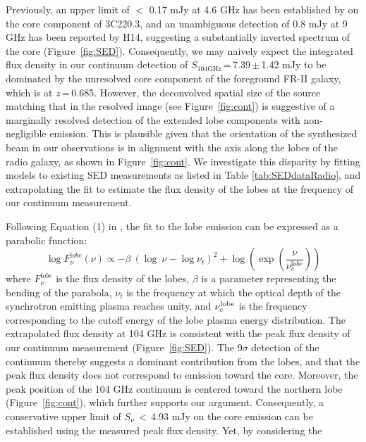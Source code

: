\documentclass[twocolumn,apj,numberedappendix]{emulateapj}
\begin{document}
Previously,  an upper
limit of $<$ 0.17 mJy at 4.6 GHz has been established by \citet{Mullin06a} on the core component of 3C220.3, and an unambiguous detection of 0.8 mJy at 9 GHz has been reported by H14, suggesting a substantially inverted spectrum of the core (Figure~\ref{fig:SED}).
Consequently, we may naively expect the integrated flux density in our continuum detection of $S_\textrm{104GHz}$\,=\,7.39\,$\pm$\,1.42\,\,mJy to be dominated by the unresolved core component of the foreground FR-II galaxy, which is at $z$\,=\,0.685.
However, the deconvolved spatial size of the source matching that in the resolved image (see Figure~\ref{fig:cont}) is
suggestive of a marginally resolved detection of the extended lobe components with non-negligible emission.
This is plausible given that the orientation of the synthesized beam in our observations is in alignment with the
axis along the
lobes of the radio galaxy, as shown in Figure~\ref{fig:cont}. We investigate this disparity by fitting models to
existing SED measurements as listed in Table \ref{tab:SEDdataRadio}, and extrapolating the fit to
estimate the flux density of the lobes at the frequency of our continuum measurement.

Following Equation (1) in \citet{Cleary07a}, the fit to the lobe emission can be expressed as a parabolic function:
\begin{equation}
\log F_{\nu}^{\mathrm lobe} (\nu) \propto - \beta\ (\log\ \nu - \log \nu_{t})^2  + \log (\exp({\frac{\nu}{\nu_c^{\mathrm lobe}}}))
\end{equation}
where $F_{\nu}^{\mathrm lobe}$ is the flux density of the lobes, $\beta$ is a parameter representing the bending
of the parabola, $\nu_t$ is the frequency at which the optical depth of the synchrotron emitting plasma reaches
unity, and $\nu_c^{\rm lobe}$ is the frequency corresponding to the cutoff energy of the lobe plasma energy
distribution. %
The extrapolated flux density at 104\,\,GHz is consistent with the peak flux density of our continuum
measurement (Figure~\ref{fig:SED}). The 9$\sigma$ detection of the continuum thereby suggests a
dominant contribution from the lobes, and that the peak flux density does not correspond to emission toward
the core. Moreover, the peak position of the 104\,\,GHz continuum is
centered toward the northern lobe (Figure~\ref{fig:cont}), which further supports our argument. 
Consequently, a conservative upper limit of $S_\nu$\,$<$\,4.93 mJy on the core emission can be established using the measured peak flux density. Yet, by considering the 
\end{document}
